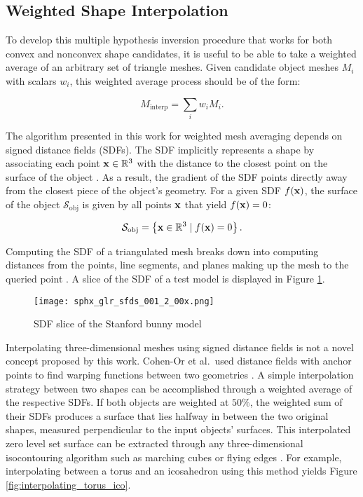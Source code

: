\subsection{Weighted Shape Interpolation}

To develop this multiple hypothesis inversion procedure that works for both convex and nonconvex shape candidates, it is useful to be able to take a weighted average of an arbitrary set of triangle meshes. Given candidate object meshes $M_i$ with scalars $w_i$, this weighted average process should be of the form:

\begin{equation}
  M_{\mathrm{interp}} = \sum_{i}{w_i M_i}.
\end{equation}

The algorithm presented in this work for weighted mesh averaging depends on signed distance fields (SDFs). The SDF implicitly represents a shape by associating each point $\mathbf{x} \in \mathbb{R}^3$ with the distance to the closest point on the surface of the object \cite{baerentzen2002}. As a result, the gradient of the SDF points directly away from the closest piece of the object's geometry. For a given SDF $f(\mathbf{x})$, the surface of the object $\mathcal{S}_\mathrm{obj}$ is given by all points $\mathbf{x}$ that yield $f(\mathbf{x}) = 0$:

\begin{equation} \label{eq:sdf_zero_level_set}
  \mathcal{S}_\mathrm{obj} = \left\{ \mathbf{x} \in \mathbb{R}^3 \mid f(\mathbf{x}) = 0 \right\}.
\end{equation}

Computing the SDF of a triangulated mesh breaks down into computing distances from the points, line segments, and planes making up the mesh to the queried point \cite{baerentzen2002}. A slice of the SDF of a test model is displayed in Figure \ref{fig:sdf_slice}.

\graphicspath{{/Users/liamrobinson/Documents/PyLightCurves/docs/build/html/_images}}
\begin{figure}[!htb]
  \centering
  \texttt{[image: sphx\_glr\_sfds\_001\_2\_00x.png]}
  \caption{SDF slice of the Stanford bunny model}
  \label{fig:sdf_slice}
\end{figure}

Interpolating three-dimensional meshes using signed distance fields is not a novel concept proposed by this work. Cohen-Or et al.\ used distance fields with anchor points to find warping functions between two geometries \cite{cohen_or1998}. A simple interpolation strategy between two shapes can be accomplished through a weighted average of the respective SDFs. If both objects are weighted at $50\%$, the weighted sum of their SDFs produces a surface that lies halfway in between the two original shapes, measured perpendicular to the input objects' surfaces. This interpolated zero level set surface can be extracted through any three-dimensional isocontouring algorithm such as marching cubes \cite{lorensen1987} or flying edges \cite{schroeder2015}. For example, interpolating between a torus and an icosahedron using this method yields Figure \ref{fig:interpolating_torus_ico}. 

